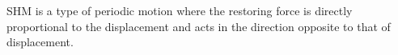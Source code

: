 \documentclass[preview]{standalone}
\begin{document}
\begin{center}
SHM is a type of periodic motion where the restoring force is directly proportional to the displacement and acts in the direction opposite to that of displacement.
\end{center}
\end{document}
